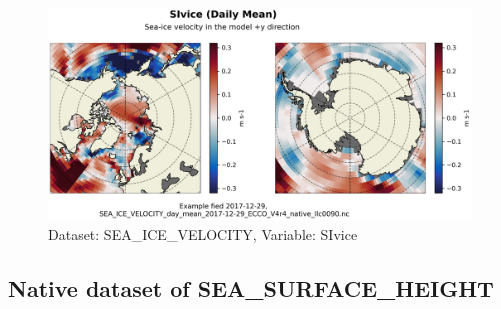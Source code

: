 \begin{figure}[H]
\centering
\includegraphics[scale=0.55]{../images/plots/native_plots/Sea-Ice_Velocity/SIvice.png}
\caption{Dataset: SEA\_ICE\_VELOCITY, Variable: SIvice}
\label{tab:table-SEA_ICE_VELOCITY_SIvice-Plot}
\end{figure}
\subsection{Native dataset of SEA\_SURFACE\_HEIGHT}
\newp
